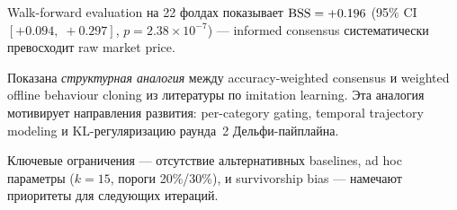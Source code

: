 Walk-forward evaluation на 22 фолдах показывает $\mathrm{BSS} = +0.196$
(95\% CI $[+0.094,\; +0.297]$, $p = 2.38 \times 10^{-7}$) ---
informed consensus систематически превосходит raw market price.

Показана \emph{структурная аналогия} между accuracy-weighted
consensus и weighted offline behaviour cloning из литературы
по imitation learning.
Эта аналогия мотивирует направления развития:
per-category gating, temporal trajectory modeling
и KL-регуляризацию раунда~2 Дельфи-пайплайна.

Ключевые ограничения --- отсутствие альтернативных baselines,
ad hoc параметры ($k = 15$, пороги 20\%/30\%),
и survivorship bias --- намечают приоритеты для следующих итераций.

